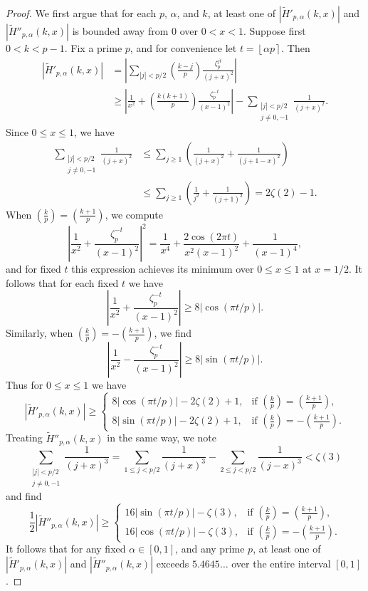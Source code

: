 \documentclass[reqno]{amsart}
\numberwithin{equation}{section}
\numberwithin{table}{section}
\numberwithin{figure}{section}
\newcommand\thinsp{5pt}
\newcommand{\leg}[2]{\left(\frac{#1}{#2}\right)}
\newcommand{\abs}[1]{\left\lvert#1\right\rvert}
\newcommand{\round}[1]{\left\lfloor#1\right\rceil}
\begin{document}
\begin{proof}
We first argue that for each $p$, $\alpha$, and $k$, at least one of $|\widetilde{H}'_{p,\alpha}(k,x)|$ and $|\widetilde{H}''_{p,\alpha}(k,x)|$ is bounded away from $0$ over $0<x<1$.
Suppose first $0<k<p-1$.
Fix a prime $p$, and for convenience let $t=\round{\alpha p}$.
Then
\begin{align*}
\abs{\widetilde{H}'_{p,\alpha}(k,x)}
&=
\abs{\sum_{\abs{j}<p/2} \leg{k-j}{p} \frac{\zeta_p^{jt}}{(j+x)^2}}\\
&\geq
\abs{\frac{1}{x^2} + \leg{k(k+1)}{p}\frac{\zeta_p^{-t}}{(x-1)^2}} - \sum_{\substack{\abs{j}<p/2\\j\neq0,-1}} \frac{1}{(j+x)^2}.
\end{align*}
Since $0\leq x\leq1$, we have
\begin{align*}
\sum_{\substack{\abs{j}<p/2\\j\neq0,-1}} \frac{1}{(j+x)^2}
&\leq
\sum_{j\geq1} \left(\frac{1}{(j+x)^2} + \frac{1}{(j+1-x)^2}\right)\\
&\leq
\sum_{j\geq1} \left(\frac{1}{j^2} + \frac{1}{(j+1)^2}\right)
= 2\zeta(2)-1.
\end{align*}
When $\leg{k}{p}=\leg{k+1}{p}$, we compute
\[
\abs{\frac{1}{x^2} + \frac{\zeta_p^{-t}}{(x-1)^2}}^2 = 
\frac{1}{x^4} + \frac{2\cos(2\pi t)}{x^2(x-1)^2} + \frac{1}{(x-1)^4},
\]
and for fixed $t$ this expression achieves its minimum over $0\leq x\leq1$ at $x=1/2$.
It follows that for each fixed $t$ we have
\[
\abs{\frac{1}{x^2} + \frac{\zeta_p^{-t}}{(x-1)^2}} \geq 8 \abs{\cos(\pi t/p)}.
\]
Similarly, when $\leg{k}{p}=-\leg{k+1}{p}$, we find
\[
\abs{\frac{1}{x^2} - \frac{\zeta_p^{-t}}{(x-1)^2}} \geq 8\abs{\sin(\pi t/p)}.
\]
Thus for $0\leq x\leq1$ we have
\[
\abs{\widetilde{H}'_{p,\alpha}(k,x)} \geq
\begin{cases}
8\abs{\cos(\pi t/p)} - 2\zeta(2) + 1, & \textrm{if $\leg{k}{p}=\leg{k+1}{p}$},\\[\thinsp]
8\abs{\sin(\pi t/p)} - 2\zeta(2) + 1, & \textrm{if $\leg{k}{p}=-\leg{k+1}{p}$}.
\end{cases}
\]
Treating $\widetilde{H}''_{p,\alpha}(k,x)$ in the same way, we note
\[
\sum_{\substack{\abs{j}<p/2\\j\neq0,-1}} \frac{1}{(j+x)^3}
= \sum_{1\leq j<p/2} \frac{1}{(j+x)^3} - \sum_{2\leq j<p/2} \frac{1}{(j-x)^3} < \zeta(3)
\]
and find
\[
\frac{1}{2}\abs{\widetilde{H}''_{p,\alpha}(k,x)} \geq
\begin{cases}
16\abs{\sin(\pi t/p)} - \zeta(3), & \textrm{if $\leg{k}{p}=\leg{k+1}{p}$},\\[\thinsp]
16\abs{\cos(\pi t/p)} - \zeta(3), & \textrm{if $\leg{k}{p}=-\leg{k+1}{p}$}.
\end{cases}
\]
It follows that for any fixed $\alpha\in[0,1]$, and any prime $p$, at least one of $|\widetilde{H}'_{p,\alpha}(k,x)|$ and $|\widetilde{H}''_{p,\alpha}(k,x)|$ exceeds $5.4645\ldots$ over the entire interval $[0,1]$.


\end{proof}
\end{document}
